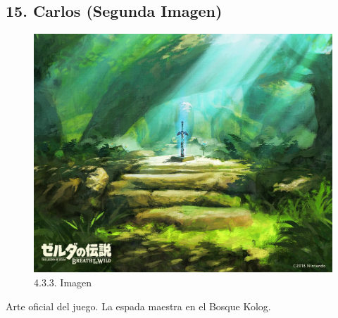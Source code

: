 \documentclass[12pt]{article}
\begin{document}
\subsection{15. Carlos (Segunda Imagen)}
    \begin{figure}[H]
      \centering
      \includegraphics[width=\textwidth]{images/Concepts/15_concept_art.jpg}
      \caption{\small 4.3.3. Imagen}
    \end{figure}
    Arte oficial del juego. La espada maestra en el Bosque Kolog.
\end{document}

